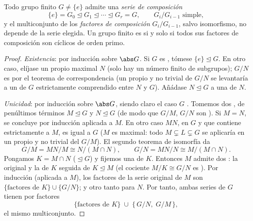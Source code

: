 \begin{theorem}\label{thm:b3:groups:jordanholder}
Todo grupo finito $G \neq \{e\}$ admite una \emph{serie de
composición}
\[
\{e\} = G_0 \trianglelefteq G_1 \trianglelefteq \cdots
\trianglelefteq G_r = G,
\qquad G_{i}/G_{i-1} \text{ simple},
\]
y el multiconjunto de los \emph{factores de composición} $G_i/G_{i-1}$,
salvo isomorfismo, no depende de la serie elegida. Un grupo finito es
 si y solo si todos sus
factores de composición son cíclicos de orden primo.
\end{theorem}

\begin{proof}
\emph{Existencia}: por inducción sobre $\abs G$. Si $G$ es
, tómese $\{e\} \trianglelefteq G$.
En otro caso, elíjase un 
propio maximal $N$ (solo hay un número finito de subgrupos); $G/N$ es
 por el teorema de correspondencia
(un  propio y no trivial
de $G/N$ se levantaría a un  de $G$ estrictamente comprendido entre $N$ y $G$). Añádase
$N \trianglelefteq G$ a una  de $N$.

\emph{Unicidad}: por inducción sobre $\abs G$, siendo claro el caso $G$
. Tomemos dos
, de
penúltimos términos $M \trianglelefteq G$ y $N \trianglelefteq G$ (de
modo que $G/M$, $G/N$ son ). Si
$M = N$, se concluye por inducción aplicada a $M$. En otro caso $MN$,
 en $G$ y que contiene
estrictamente a $M$, es igual a $G$ ($M$ es
 maximal: todo
 $M \subsetneq L
\subsetneq G$ se aplicaría en un  propio y no trivial del 
$G/M$). El segundo teorema de isomorfía da
\[
G/M = MN/M \cong N/(M \cap N),
\qquad
G/N = MN/N \cong M/(M \cap N).
\]
Pongamos $K = M \cap N$ ($\trianglelefteq G$) y fijemos una
 de $K$.
Entonces $M$ admite dos : la original y la de $K$ seguida de $K \trianglelefteq
M$ (el cociente $M/K \cong G/N$ es
). Por inducción (aplicada a $M$),
los factores de la serie original de $M$ son
$\{\text{factores de } K\} \cup \{G/N\}$; y otro tanto para $N$. Por
tanto, ambas series de $G$ tienen por factores
\[
\{\text{factores de } K\} \;\cup\; \{\,G/N,\; G/M\,\},
\]
el mismo multiconjunto.


\end{proof}
